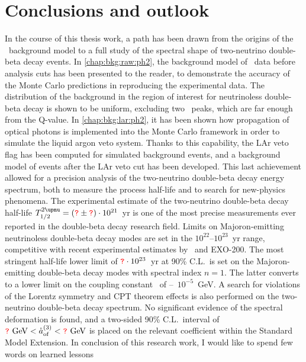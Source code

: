 
\chapter*{Conclusions and outlook}%
\label{chap:concl}

In the course of this thesis work, a path has been drawn from the origins of the \gerda\
background model to a full study of the spectral shape of two-neutrino double-beta decay
events. In \cref{chap:bkg:raw:ph2}, the background model of \gerdatwo\ data before
analysis cuts has been presented to the reader, to demonstrate the accuracy of the Monte
Carlo predictions in reproducing the experimental data. The distribution of the background
in the region of interest for neutrinoless double-beta decay is shown to be uniform,
excluding two \g\ peaks, which are far enough from the Q-value. In
\cref{chap:bkg:lar:ph2}, it has been shown how propagation of optical photons is
implemented into the Monte Carlo framework in order to simulate the liquid argon veto
system. Thanks to this capability, the LAr veto flag has been computed for simulated
background events, and a background model of events after the LAr veto cut has been
developed. This last achievement allowed for a precision analysis of the two-neutrino
double-beta decay energy spectrum, both to measure the process half-life and to search for
new-physics phenomena. The experimental estimate of the two-neutrino double-beta decay
half-life $\thalftwoM = (\fillme{?} \pm \fillme{?}) \cdot 10^{21}$~yr is one of the most
precise measurements ever reported in the double-beta decay research field. Limits on
Majoron-emitting neutrinoless double-beta decay modes are set in the
$10^{22}$--$10^{23}$~yr range, competitive with recent experimental estimates by
\kamlandzen\ and EXO-200. The most stringent half-life lower limit of $\textcolor{red}{\texttt{?}} \cdot
10^{23}$~yr at 90\% C.L.~is set on the Majoron-emitting double-beta decay modes with
spectral index $n=1$. The latter converts to a lower limit on the coupling constant \ga\
of --~$10^{-5}$~GeV. A search for violations of the Lorentz symmetry
and CPT theorem effects is also performed on the two-neutrino double-beta decay spectrum.
No significant evidence of the spectral deformation is found, and a two-sided 90\%
C.L.~interval of $\textcolor{red}{\texttt{?}}~\text{GeV} < {\mathring{a}_\text{of}^{(3)}} < \textcolor{red}{\texttt{?}}~\text{GeV}$ is placed on the
relevant coefficient within the Standard Model Extension.
\newpar
In conclusion of this research work, I would like to spend few words on learned lessons

